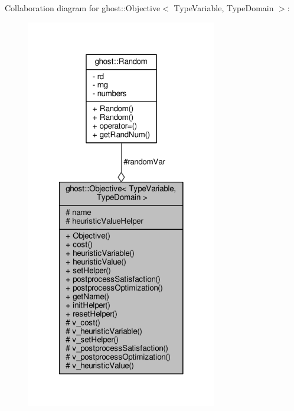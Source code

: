 Collaboration diagram for ghost\-:\-:Objective$<$ Type\-Variable, Type\-Domain $>$\-:\nopagebreak
\begin{figure}[H]
\begin{center}
\leavevmode
\includegraphics[width=236pt]{classghost_1_1Objective__coll__graph}
\end{center}
\end{figure}
